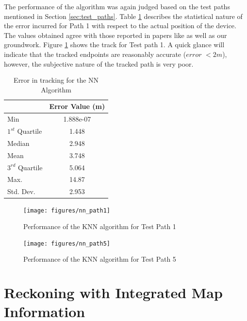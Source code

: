 The performance of the algorithm was again judged based on the test paths
mentioned in Section \ref{sec:test_paths}. Table \ref{tbl:NN_error} describes
the statistical nature of the error incurred for Path 1 with respect to the
actual position of the device. The values obtained agree with those reported in
papers like \cite{Wang} as well as our groundwork. Figure \ref{fig:nn_path1}
shows the track for Test path 1. A quick glance will indicate that the tracked
endpoints are reasonably accurate ($error$ $< 2 m$), however, the subjective nature
of the tracked path is very poor.

\begin{table}
\centering
\begin{tabular}{l c}
\hline
\hline
 & Error Value (m)\\
\hline
Min & 1.888e-07\\
$1^{st}$ Quartile & 1.448\\
Median & 2.948\\
Mean  & 3.748\\
$3^{rd}$ Quartile & 5.064\\
 Max.   & 14.87\\
Std. Dev. & 2.953\\
\hline
\end{tabular}
\caption{Error in tracking for the NN Algorithm\label{tbl:NN_error}}
\end{table}

\begin{figure}
    \centering
    \texttt{[image: figures/nn\_path1]}
    \caption{Performance of the KNN algorithm for Test Path 1\label{fig:nn_path1}}
\end{figure}

\begin{figure}
    \centering
    \texttt{[image: figures/nn\_path5]}
    \caption{Performance of the KNN algorithm for Test Path 5\label{fig:nn_path5}}
\end{figure}



\section{Reckoning with Integrated Map Information}

